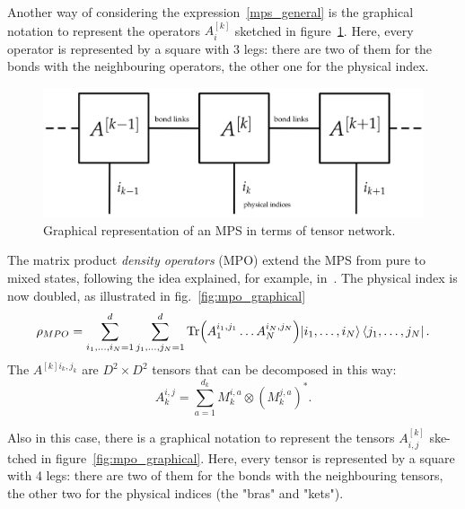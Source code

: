 Another way of considering the expression~\ref{mps_general} is the graphical notation to represent the operators $A^{[k]}_i$ sketched in figure~\ref{fig:mps_graphical}. Here, every operator is represented by a square with 3 legs: there are two of them for the bonds with the neighbouring operators, the other one for the physical index. 

\begin{figure}[H]
    \centering
    \includegraphics[scale=0.4]{Figures/mps_graphical.png}
    \captionsetup{width=1.\linewidth}
    \caption{Graphical representation of an MPS in terms of tensor network.}
    \label{fig:mps_graphical}
\end{figure}

The matrix product \emph{density operators} (MPO) extend the MPS from pure to mixed states, following the idea explained, for example, in~\cite{PhysRevLett.93.207204}. The physical index is now doubled, as illustrated in fig.~\ref{fig:mpo_graphical}
\begin{equation}
\label{eqn:mpdo}
    \rho_{MPO} = \sum_{i_1, \dots ,i_N = 1}^{d} \sum_{j_1, \dots ,j_N = 1}^{d} \operatorname{Tr}\Bigl(A_1^{i_1,j_1} \dots A_N^{i_N,j_N}\Bigl) \ket{i_1, \dots ,i_N}\bra{j_1, \dots ,j_N}.
\end{equation}
The $A^{[k]i_k,j_k}$ are $D^2 \times D^2$ tensors that can be decomposed in this way:
\begin{equation*}
    A_k^{i,j} = \sum_{a = 1}^{d_k} M_k^{i,a} \otimes (M_k^{j,a})^*.
\end{equation*}

Also in this case, there is a graphical notation to represent the tensors $A^{[k]}_{i,j}$ ske-tched in figure~\ref{fig:mpo_graphical}. Here, every tensor is represented by a square with 4 legs: there are two of them for the bonds with the neighbouring tensors, the other two for the physical indices (the "bras" and "kets"). 

